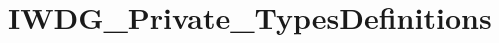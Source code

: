\hypertarget{group___i_w_d_g___private___types_definitions}{\section{I\-W\-D\-G\-\_\-\-Private\-\_\-\-Types\-Definitions}
\label{group___i_w_d_g___private___types_definitions}
}
